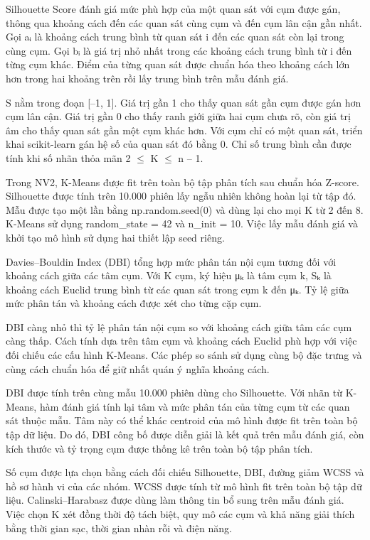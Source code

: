 \documentclass[conference,a4paper]{IEEEtran}
\begin{document}
Silhouette Score đánh giá mức phù hợp của một quan sát với cụm được gán, thông qua khoảng cách đến các quan sát cùng cụm và đến cụm lân cận gần nhất. Gọi aᵢ là khoảng cách trung bình từ quan sát i đến các quan sát còn lại trong cùng cụm. Gọi bᵢ là giá trị nhỏ nhất trong các khoảng cách trung bình từ i đến từng cụm khác. Điểm của từng quan sát được chuẩn hóa theo khoảng cách lớn hơn trong hai khoảng trên rồi lấy trung bình trên mẫu đánh giá.

S nằm trong đoạn [–1, 1]. Giá trị gần 1 cho thấy quan sát gần cụm được gán hơn cụm lân cận. Giá trị gần 0 cho thấy ranh giới giữa hai cụm chưa rõ, còn giá trị âm cho thấy quan sát gần một cụm khác hơn. Với cụm chỉ có một quan sát, triển khai scikit-learn gán hệ số của quan sát đó bằng 0. Chỉ số trung bình cần được tính khi số nhãn thỏa mãn 2  \(\leq\)  K  \(\leq\)  n – 1.

Trong NV2, K-Means được fit trên toàn bộ tập phân tích sau chuẩn hóa Z-score. Silhouette được tính trên 10.000 phiên lấy ngẫu nhiên không hoàn lại từ tập đó. Mẫu được tạo một lần bằng np.random.seed(0) và dùng lại cho mọi K từ 2 đến 8. K-Means sử dụng random\_state = 42 và n\_init = 10. Việc lấy mẫu đánh giá và khởi tạo mô hình sử dụng hai thiết lập seed riêng.

Davies–Bouldin Index (DBI) tổng hợp mức phân tán nội cụm tương đối với khoảng cách giữa các tâm cụm. Với K cụm, ký hiệu μₖ là tâm cụm k, Sₖ là khoảng cách Euclid trung bình từ các quan sát trong cụm k đến μₖ. Tỷ lệ giữa mức phân tán và khoảng cách được xét cho từng cặp cụm.

DBI càng nhỏ thì tỷ lệ phân tán nội cụm so với khoảng cách giữa tâm các cụm càng thấp. Cách tính dựa trên tâm cụm và khoảng cách Euclid phù hợp với việc đối chiếu các cấu hình K-Means. Các phép so sánh sử dụng cùng bộ đặc trưng và cùng cách chuẩn hóa để giữ nhất quán ý nghĩa khoảng cách.

DBI được tính trên cùng mẫu 10.000 phiên dùng cho Silhouette. Với nhãn từ K-Means, hàm đánh giá tính lại tâm và mức phân tán của từng cụm từ các quan sát thuộc mẫu. Tâm này có thể khác centroid của mô hình được fit trên toàn bộ tập dữ liệu. Do đó, DBI công bố được diễn giải là kết quả trên mẫu đánh giá, còn kích thước và tỷ trọng cụm được thống kê trên toàn bộ tập phân tích.

Số cụm được lựa chọn bằng cách đối chiếu Silhouette, DBI, đường giảm WCSS và hồ sơ hành vi của các nhóm. WCSS được tính từ mô hình fit trên toàn bộ tập dữ liệu. Calinski–Harabasz được dùng làm thông tin bổ sung trên mẫu đánh giá. Việc chọn K xét đồng thời độ tách biệt, quy mô các cụm và khả năng giải thích bằng thời gian sạc, thời gian nhàn rỗi và điện năng.
\end{document}
